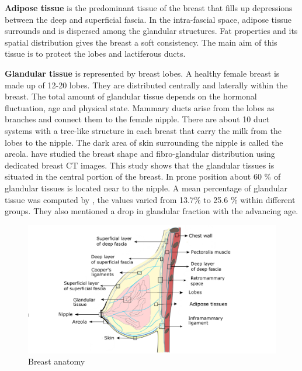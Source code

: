  \textbf{Adipose tissue} is the predominant tissue of the breast that fills up depressions between the deep and superficial fascia. In the intra-fascial space, adipose tissue surrounds and is dispersed among the glandular structures. Fat properties and its spatial distribution gives the breast a soft consistency. The main aim of this tissue is to protect the lobes and lactiferous ducts.

\textbf{Glandular tissue} is represented by breast lobes. A healthy female breast is made up of 12-20 lobes. They are distributed centrally and laterally within the breast. The total amount of glandular tissue depends on the hormonal fluctuation, age and physical state.  Mammary ducts arise from the lobes as branches and connect them to the female nipple. There are about 10 duct systems with a tree-like structure in each breast that carry the milk from the lobes to the nipple. The dark area of skin surrounding the nipple is called the areola. \cite{huang2011characterization} have studied the breast shape and fibro-glandular distribution using dedicated breast CT images. This study shows that the glandular tissues is situated in the central portion of the breast. In prone position about 60 $\%$ of glandular tissues is located near to the nipple. A mean percentage of glandular tissue was computed by \cite{yaffe2009myth}, the values varied from 13.7$\%$ to 25.6 $\%$ within different groups. They also mentioned a drop in glandular fraction with the advancing age. 


\begin{center}
\begin{figure}[h]
\includegraphics[width=\textwidth,keepaspectratio]{figures/anatomieSeinEuBlack2.png} 
\caption{Breast anatomy}
\label{fig:breastanatomy}
\end{figure}
\end{center}

